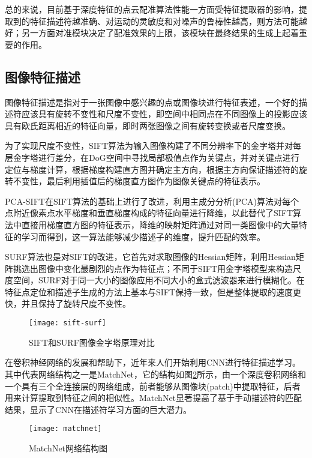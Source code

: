 总的来说，目前基于深度特征的点云配准算法性能一方面受特征提取器的影响，提取到的特征描述符越准确、对运动的灵敏度和对噪声的鲁棒性越高，则方法可能越好；另一方面对准模块决定了配准效果的上限，该模块在最终结果的生成上起着重要的作用。

\subsection{图像特征描述}
图像特征描述是指对于一张图像中感兴趣的点或图像块进行特征表述，一个好的描述符应该具有旋转不变性和尺度不变性，即空间中相同点在不同图像上的投影应该具有欧氏距离相近的特征向量，即时两张图像之间有旋转变换或者尺度变换。

为了实现尺度不变性，SIFT算法\cite{lowe2004distinctive}为输入图像构建了不同分辨率下的金字塔并对每层金字塔进行差分，在DoG空间中寻找局部极值点作为关键点\cite{lindeberg1994scale}，并对关键点进行定位与梯度计算，根据梯度构建直方图并确定主方向，根据主方向保证描述符的旋转不变性，最后利用插值后的梯度直方图作为图像关键点的特征表示。

PCA-SIFT\cite{ke2004pca}在SIFT算法的基础上进行了改进，利用主成分分析(PCA)算法\cite{wold1987principal}对每个点附近像素点水平梯度和垂直梯度构成的特征向量进行降维，以此替代了SIFT算法中直接用梯度直方图的特征表示，降维的映射矩阵通过对同一类图像中的大量特征的学习而得到，这一算法能够减少描述子的维度，提升匹配的效率。

SURF算法\cite{bay2006surf}也是对SIFT的改进，它首先对求取图像的Hessian矩阵，利用Hessian矩阵挑选出图像中变化最剧烈的点作为特征点；不同于SIFT用金字塔模型来构造尺度空间，SURF对于同一大小的图像应用不同大小的盒式滤波器来进行模糊化。在特征点定位和描述子生成的方法上基本与SIFT保持一致，但是整体提取的速度更快，并且保持了旋转尺度不变性。
\begin{figure}
	\centering
	\texttt{[image: sift-surf]}
	\caption{SIFT和SURF图像金字塔原理对比}
	\label{sift-surf}
\end{figure}

在卷积神经网络的发展和帮助下，近年来人们开始利用CNN进行特征描述学习。其中代表网络结构之一是MatchNet\cite{han2015matchnet}，它的结构如图\ref{matchnet}所示，由一个深度卷积网络和一个具有三个全连接层的网络组成，前者能够从图像块(patch)中提取特征，后者用来计算提取到特征之间的相似性。MatchNet显著提高了基于手动描述符的匹配结果，显示了CNN在描述符学习方面的巨大潜力。
\begin{figure}
	\centering
	\texttt{[image: matchnet]}
	\caption{MatchNet网络结构图}
	\label{matchnet}
\end{figure}

